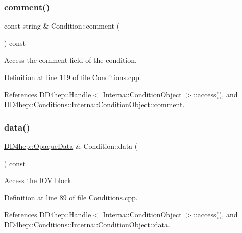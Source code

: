 \hypertarget{class_d_d4hep_1_1_conditions_1_1_condition_aa3f9ebc9c6ce338f5a688dd268192031}{}\label{class_d_d4hep_1_1_conditions_1_1_condition_aa3f9ebc9c6ce338f5a688dd268192031} 
\subsubsection{\texorpdfstring{comment()}{comment()}}
{\footnotesize\ttfamily const string \& Condition\+::comment (\begin{DoxyParamCaption}{ }\end{DoxyParamCaption}) const}



Access the comment field of the condition. 



Definition at line 119 of file Conditions.\+cpp.



References D\+D4hep\+::\+Handle$<$ Interna\+::\+Condition\+Object $>$\+::access(), and D\+D4hep\+::\+Conditions\+::\+Interna\+::\+Condition\+Object\+::comment.

\hypertarget{class_d_d4hep_1_1_conditions_1_1_condition_aae50a2f98a0baabcfaab2a8167a10b3e}{}\label{class_d_d4hep_1_1_conditions_1_1_condition_aae50a2f98a0baabcfaab2a8167a10b3e} 
\subsubsection{\texorpdfstring{data()}{data()}}
{\footnotesize\ttfamily \hyperlink{class_d_d4hep_1_1_opaque_data}{D\+D4hep\+::\+Opaque\+Data} \& Condition\+::data (\begin{DoxyParamCaption}{ }\end{DoxyParamCaption}) const}



Access the \hyperlink{class_d_d4hep_1_1_i_o_v}{I\+OV} block. 



Definition at line 89 of file Conditions.\+cpp.



References D\+D4hep\+::\+Handle$<$ Interna\+::\+Condition\+Object $>$\+::access(), and D\+D4hep\+::\+Conditions\+::\+Interna\+::\+Condition\+Object\+::data.



